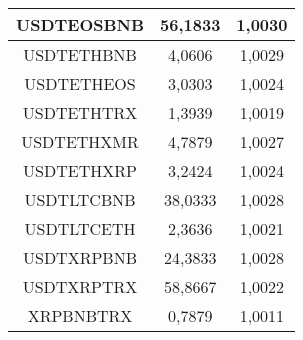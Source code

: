 \begin{table}
\begin{tabular}{|| c | c | c ||}
 \hline USDTEOSBNB & 56,1833 & 1,0030\\ 
 \hline USDTETHBNB & 4,0606 & 1,0029\\ 
 \hline USDTETHEOS & 3,0303 & 1,0024\\ 
 \hline USDTETHTRX & 1,3939 & 1,0019\\ 
 \hline USDTETHXMR & 4,7879 & 1,0027\\ 
 \hline USDTETHXRP & 3,2424 & 1,0024\\ 
 \hline USDTLTCBNB & 38,0333 & 1,0028\\ 
 \hline USDTLTCETH & 2,3636 & 1,0021\\ 
 \hline USDTXRPBNB & 24,3833 & 1,0028\\ 
 \hline USDTXRPTRX & 58,8667 & 1,0022\\ 
 \hline XRPBNBTRX & 0,7879 & 1,0011\\ 
 \hline
\end{tabular}
\end{table}